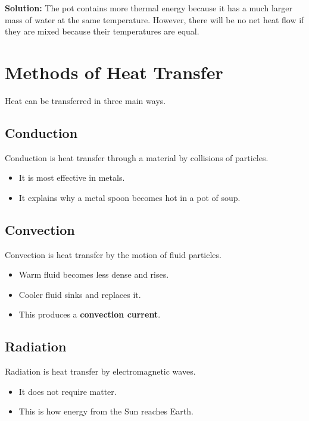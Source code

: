 \textbf{Solution:} The pot contains more thermal energy because it has a much larger mass of water at the same temperature. However, there will be no net heat flow if they are mixed because their temperatures are equal.

\section{Methods of Heat Transfer}
Heat can be transferred in three main ways.

\subsection{Conduction}
Conduction is heat transfer through a material by collisions of particles.

\begin{itemize}
    \item It is most effective in metals.
    \item It explains why a metal spoon becomes hot in a pot of soup.
\end{itemize}

\subsection{Convection}
Convection is heat transfer by the motion of fluid particles.

\begin{itemize}
    \item Warm fluid becomes less dense and rises.
    \item Cooler fluid sinks and replaces it.
    \item This produces a \textbf{convection current}.
\end{itemize}

\subsection{Radiation}
Radiation is heat transfer by electromagnetic waves.

\begin{itemize}
    \item It does not require matter.
    \item This is how energy from the Sun reaches Earth.
\end{itemize}

